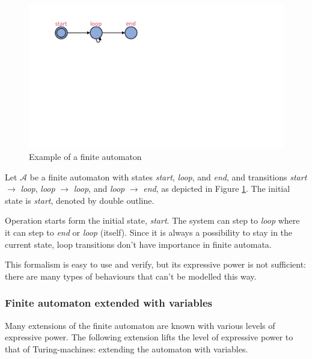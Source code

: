 \begin{figure}
	\centering
	\begin{minipage}{0.5\textwidth}
		\includegraphics[width=\textwidth]{include/figures/loop_example_unclocked}%
		\caption{Example of a finite automaton}
		\label{fig:faex}
	\end{minipage}
\end{figure}

\begin{example}
	Let $\mathcal{A}$ be a finite automaton with states \emph{start}, \emph{loop}, and \emph{end}, and transitions  \emph{start} $\to$ \emph{loop}, \emph{loop} $\to$ \emph{loop}, and \emph{loop} $\to$ \emph{end}, as depicted in Figure \ref{fig:faex}. The initial state is \emph{start}, denoted by double outline.
	
	Operation starts form the initial state, \emph{start}. The system can step to \emph{loop} where it can step to \emph{end} or \emph{loop} (itself). Since it is always a possibility to stay in the current state, loop transitions don't have importance in finite automata.
\end{example}

This formalism is easy to use and verify, but its expressive power is not sufficient: there are many types of behaviours that can't be modelled this way.

\subsubsection{Finite automaton extended with variables} \label{sec:extfa}

Many extensions of the finite automaton are known with various levels of expressive power. The following extension lifts the level of expressive power to that of Turing-machines: extending the automaton with variables.


